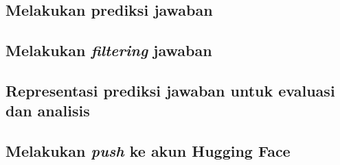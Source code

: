 \subsection{Melakukan prediksi jawaban}

\subsection{Melakukan \emph{filtering} jawaban}

\subsection{Representasi prediksi jawaban untuk evaluasi dan analisis}

\subsection{Melakukan \emph{push} ke akun Hugging Face}
